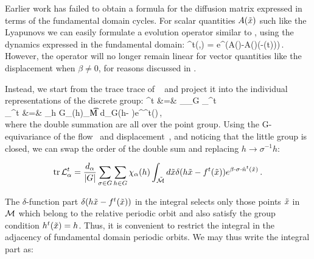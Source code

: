 



Earlier work has failed to obtain a formula for the
diffusion matrix expressed in terms of the fundamental domain cycles.
For scalar quantities $A(\tilde x)$ such like the Lyapunovs we can easily
formulate a evolution operator similar to , using
the dynamics expressed in the fundamental domain:
\beq
{}^t(,) = 
e^{\beta (A()-A(\tx)}\delta(-\tx(t)))\,.
\eeq
However, the operator will no longer remain linear for vector 
quantities like the displacement when $\beta \neq 0$, for reasons 
discussed in . 
    

Instead, we start from the trace trace of \evOper\ 
 and project it into the individual 
representations of the discrete group:
\bea
{}^t &=& \sum_{\alpha \in\II_G} _{\alpha}^t\nonumber\\
\tr{\cal L}_{\alpha}^{t} &=& \frac{d_\alpha}{|G|}\sum_{h \in
  G}\chi_\alpha(h)\int_{\t {\cal M}} d\tx \sum_{\sigma \in G}\delta (h\tx -
\flow{t}{\sigma\tx})e^{\beta\cdot\hn^t(\sigma\tx)}\,,\nonumber\\
\label{eq-traceSum}
\eea
where the double summation are all over the point group. Using the G-equivariance of the flow~ and displacement~, and noticing that the little group is closed, we can swap the order of the double sum and replacing $h\to \sigma^{-1} h$:

\[
\mbox{\rm tr}\,{\cal L}_{\alpha}^{t} = \frac{d_\alpha}{|G|}\sum_{\sigma \in
  G}\sum_{h \in G}\chi_\alpha(h)\int_{\tilde {\cal M}} d\tilde x \delta (h\tilde x -
{f^{t}(\tilde x)})e^{\beta\cdot\sigma\cdot\hat{n}^t(\tilde x)}\,.
\]


The $\delta$-function part $\delta (h\tilde x - {f^{t}(\tilde x)})$ in the integral selects only those points $\tilde x$ in ${\cal M}$ which belong to the relative periodic orbit and also satisfy the group condition $h^t(\tilde x) = h$. Thus, it is convenient to restrict the integral in the adjacency of fundamental domain periodic orbits. We may thus write the integral part as:

